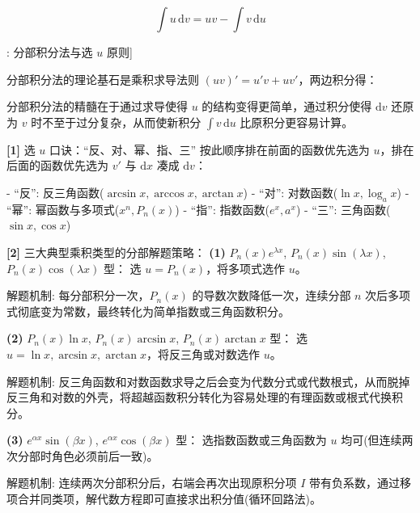 \documentclass[11pt,a4paper,UTF8]{ctexart}
\begin{document}
\begin{equation*}
\int u\,\mathrm{d}v = uv - \int v\,\mathrm{d}u
\end{equation*}
\begin{thmbox}[方法[2]: 分部积分法与选 $u$ 原则]

分部积分法的理论基石是乘积求导法则 $(uv)' = u'v + uv'$，两边积分得：


分部积分法的精髓在于通过求导使得 $u$ 的结构变得更简单，通过积分使得 $\mathrm{d}v$ 还原为 $v$ 时不至于过分复杂，从而使新积分 $\int v\,\mathrm{d}u$ 比原积分更容易计算。

\textbf{[1]} 选 $u$ 口诀：“反、对、幂、指、三”
按此顺序排在前面的函数优先选为 $u$，排在后面的函数优先选为 $v'$ 与 $\mathrm{d}x$ 凑成 $\mathrm{d}v$：

- “反”: 反三角函数($\arcsin x, \arccos x, \arctan x$)
- “对”: 对数函数($\ln x, \log_a x$)
- “幂”: 幂函数与多项式($x^n, P_n(x)$)
- “指”: 指数函数($e^x, a^x$)
- “三”: 三角函数($\sin x, \cos x$)

\textbf{[2]} 三大典型乘积类型的分部解题策略：
\textbf{(1)}  $P_n(x)e^{\lambda x}$, $P_n(x)\sin(\lambda x)$, $P_n(x)\cos(\lambda x)$ 型：
选 $u = P_n(x)$，将多项式选作 $u$。

解题机制: 每分部积分一次，$P_n(x)$ 的导数次数降低一次，连续分部 $n$ 次后多项式彻底变为常数，最终转化为简单指数或三角函数积分。

\textbf{(2)}  $P_n(x)\ln x$, $P_n(x)\arcsin x$, $P_n(x)\arctan x$ 型：
选 $u = \ln x, \arcsin x, \arctan x$，将反三角或对数选作 $u$。

解题机制: 反三角函数和对数函数求导之后会变为代数分式或代数根式，从而脱掉反三角和对数的外壳，将超越函数积分转化为容易处理的有理函数或根式代换积分。

\textbf{(3)}  $e^{\alpha x}\sin(\beta x)$, $e^{\alpha x}\cos(\beta x)$ 型：
选指数函数或三角函数为 $u$ 均可(但连续两次分部时角色必须前后一致)。

解题机制: 连续两次分部积分后，右端会再次出现原积分项 $I$ 带有负系数，通过移项合并同类项，解代数方程即可直接求出积分值(循环回路法)。

\end{thmbox}
\end{document}
